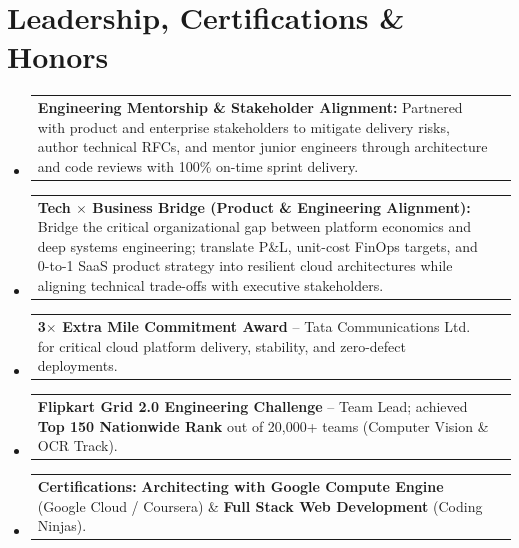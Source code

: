 \documentclass[letterpaper,9.5pt]{article}
\makeatletter
\newcommand{\resumeProjectHeading}[2]{
    \vspace{-2.5pt}\item
    \begin{tabular*}{1.0\textwidth}{l@{\extracolsep{\fill}}r}
      \small#1 & \small#2\\
    \end{tabular*}\vspace{-5pt}
}
\newcommand{\resumeSubHeadingListStart}{\begin{itemize}[leftmargin=0.0in, label={}]}
\newcommand{\resumeSubHeadingListEnd}{\end{itemize}}
\makeatother
\begin{document}
\section{Leadership, Certifications \& Honors}
  \resumeSubHeadingListStart
    \resumeProjectHeading
      {\textbf{Engineering Mentorship \& Stakeholder Alignment:} Partnered with product and enterprise stakeholders to mitigate delivery risks, author technical RFCs, and mentor junior engineers through architecture and code reviews with 100\% on-time sprint delivery.}{}
    \resumeProjectHeading
      {\textbf{Tech $\times$ Business Bridge (Product \& Engineering Alignment):} Bridge the critical organizational gap between platform economics and deep systems engineering; translate P\&L, unit-cost FinOps targets, and 0-to-1 SaaS product strategy into resilient cloud architectures while aligning technical trade-offs with executive stakeholders.}{}
    \resumeProjectHeading
      {\textbf{3$\times$ Extra Mile Commitment Award} -- Tata Communications Ltd. for critical cloud platform delivery, stability, and zero-defect deployments.}{}
    \resumeProjectHeading
      {\textbf{Flipkart Grid 2.0 Engineering Challenge} -- Team Lead; achieved \textbf{Top 150 Nationwide Rank} out of 20,000+ teams (Computer Vision \& OCR Track).}{}
    \resumeProjectHeading
      {\textbf{Certifications:} \textbf{Architecting with Google Compute Engine} (Google Cloud / Coursera) \& \textbf{Full Stack Web Development} (Coding Ninjas).}{}
  \resumeSubHeadingListEnd
\end{document}
